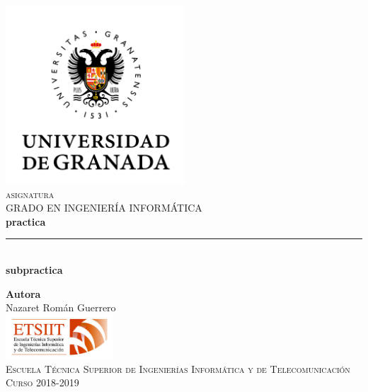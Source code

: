 \documentclass[11pt,a4paper]{article}
\begin{document}
\begin{titlepage}

\begin{minipage}{\textwidth}

\centering
\includegraphics[width=0.5\textwidth]{logo.png}\\

\textsc{\Large asignatura\\[0.2cm]}
\textsc{GRADO EN INGENIERÍA INFORMÁTICA}\\[1cm]

{\Huge\bfseries practica\\}
\noindent\rule[-1ex]{\textwidth}{3pt}\\[3.5ex]
{\large\bfseries subpractica}
\end{minipage}

\vspace{1.5cm}
\begin{minipage}{\textwidth}
\centering

\textbf{Autora}\\ {Nazaret Román Guerrero}\\[2.5ex]
\includegraphics[width=0.3\textwidth]{etsiit.jpeg}\\[0.1cm]
\vspace{1cm}
\textsc{Escuela Técnica Superior de Ingenierías Informática y de Telecomunicación}\\
\vspace{1cm}
\textsc{Curso 2018-2019}
\end{minipage}
\end{titlepage}

\tableofcontents
\thispagestyle{empty}

\newpage
\end{document}
